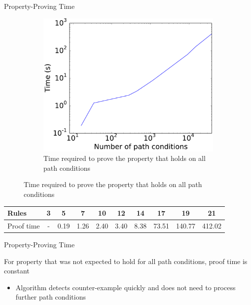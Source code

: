 \documentclass[xcolor=dvipsnames, 14pt]{beamer}
\begin{document}
\begin{frame}{Property-Proving Time}
\begin{figure}[htb]
        \centering
        \begin{subfigure}[b]{0.5\textwidth}
                \centering
                \includegraphics[width=1\textwidth]{../figures/results/pcs_vs_prop1.pdf}
                \caption{Time required to prove the property that holds on all path conditions}
                \label{fig:rules_vs_pcs}
        \end{subfigure}%
        

\end{figure}
\footnotesize
\begin{tabular}{|p{1.6cm}|c|c|c|c|c|c|c|c|c|}
\hline
Rules & 3&  5&  7&  10&  12&  14 & 17 & 19 & 21\\\hline
Proof time & -&  0.19&  1.26&  2.40&  3.40& 8.38 & 73.51 & 140.77 & 412.02\\
\hline
\end{tabular}
\normalsize
\end{frame}

\begin{frame}{Property-Proving Time}

For property that was not expected to hold for all path conditions, proof time is constant
\begin{itemize}
\item Algorithm detects counter-example quickly and does not need to process further path conditions
\end{itemize}

\normalsize
\end{frame}
\end{document}
